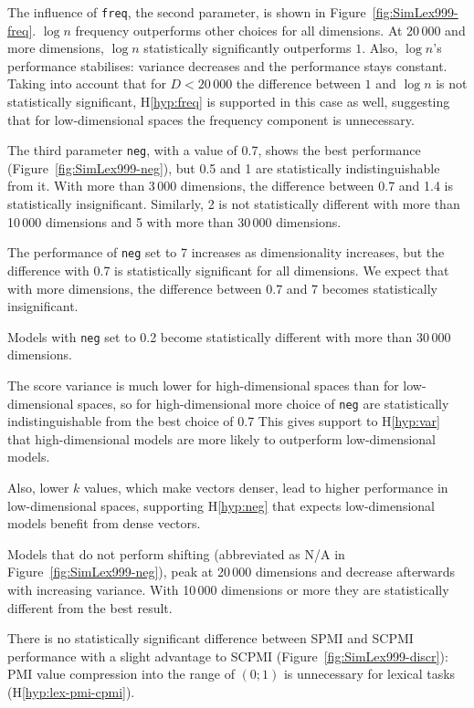 The influence of \texttt{freq}, the second parameter, is shown in Figure~\ref{fig:SimLex999-freq}. $\log n$ frequency outperforms other choices for all dimensions. At 20\,000 and more dimensions, $\log n$ statistically significantly outperforms $1$. Also, $\log n$'s performance stabilises: variance decreases and the performance stays constant. Taking into account that for $D < 20\,000$ the difference between $1$ and $\log n$ is not statistically significant, H\ref{hyp:freq} is supported in this case as well, suggesting that for low-dimensional spaces the frequency component is unnecessary.

The third parameter \texttt{neg}, with a value of 0.7, shows the best performance (Figure~\ref{fig:SimLex999-neg}), but 0.5 and 1 are statistically indistinguishable from it. With more than 3\,000 dimensions, the difference between 0.7 and 1.4 is statistically insignificant. Similarly, 2 is not statistically different with more than 10\,000 dimensions and 5 with more than 30\,000 dimensions.

The performance of \texttt{neg} set to 7 increases as dimensionality increases, but the difference with 0.7 is statistically significant for all dimensions. We expect that with more dimensions, the difference between 0.7 and 7 becomes statistically insignificant.

Models with \texttt{neg} set to 0.2 become statistically different with more than 30\,000 dimensions.
 
The score variance is much lower for high-dimensional spaces than for low-dimensional spaces, so for high-dimensional more choice of \texttt{neg} are statistically indistinguishable from the best choice of 0.7 This gives support to H\ref{hyp:var} that high-dimensional models are more likely to outperform low-dimensional models.

Also, lower $k$ values, which make vectors denser, lead to higher performance in low-dimensional spaces, supporting H\ref{hyp:neg} that expects low-dimensional models benefit from dense vectors.



Models that do not perform shifting (abbreviated as N/A in Figure~\ref{fig:SimLex999-neg}), peak at 20\,000 dimensions and decrease afterwards with increasing variance. With 10\,000 dimensions or more they are statistically different from the best result.

There is no statistically significant difference between SPMI and SCPMI performance with a slight advantage to SCPMI (Figure~\ref{fig:SimLex999-discr}): PMI value compression into the range of $(0; 1)$ is unnecessary for lexical tasks (H\ref{hyp:lex-pmi-cpmi}).

